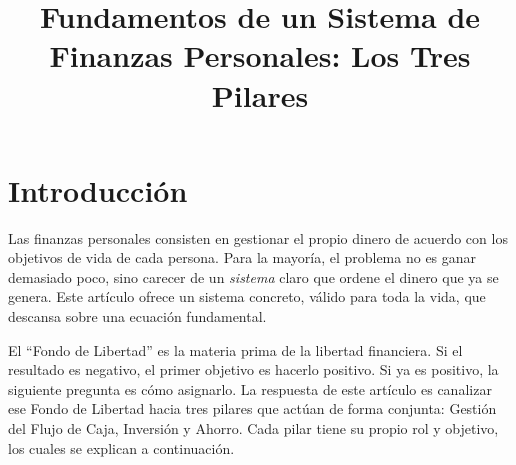 \documentclass[10pt,a4paper,twocolumn]{article}
\title{\vspace{-1.5em}\bfseries\color{accent}\Large Fundamentos de un Sistema de Finanzas Personales: Los Tres Pilares}
\author{}
\date{}
\begin{document}

\section{Introducci\'on}
Las finanzas personales consisten en gestionar el propio dinero de acuerdo con los objetivos de vida de cada persona. Para la mayor\'ia, el problema no es ganar demasiado poco, sino carecer de un \textit{sistema} claro que ordene el dinero que ya se genera. Este art\'iculo ofrece un sistema concreto, v\'alido para toda la vida, que descansa sobre una ecuaci\'on fundamental.

\begin{center}
{\setlength{\fboxsep}{10pt}}
\end{center}

El ``Fondo de Libertad'' es la materia prima de la libertad financiera. Si el resultado es negativo, el primer objetivo es hacerlo positivo. Si ya es positivo, la siguiente pregunta es c\'omo asignarlo. La respuesta de este art\'iculo es canalizar ese Fondo de Libertad hacia tres pilares que act\'uan de forma conjunta: Gesti\'on del Flujo de Caja, Inversi\'on y Ahorro. Cada pilar tiene su propio rol y objetivo, los cuales se explican a continuaci\'on.
\end{document}
